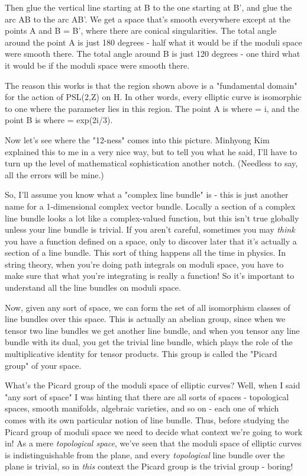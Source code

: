Then glue the vertical line starting at B to the one starting at B',
and glue the arc AB to the arc AB'.  We get a space that's smooth
everywhere except at the points A and B = B', where there are conical
singularities.  The total angle around the point A is just 180 degrees
- half what it would be if the moduli space were smooth there.  The
total angle around B is just 120 degrees - one third what it would be
if the moduli space were smooth there.

The reason this works is that the region shown above is a "fundamental
domain" for the action of PSL(2,Z) on H.  In other words, every
elliptic curve is isomorphic to one where the parameter \tau  lies in
this region.  The point A is where \tau  = i, and the point B is where
\tau  = exp(2\pi i/3).

Now let's see where the "12-ness" comes into this picture.  Minhyong
Kim explained this to me in a very nice way, but to tell you what he
said, I'll have to turn up the level of mathematical sophistication
another notch.  (Needless to say, all the errors will be mine.)

So, I'll assume you know what a "complex line bundle" is - this is
just another name for a 1-dimensional complex vector bundle.  Locally
a section of a complex line bundle looks a lot like a complex-valued
function, but this isn't true globally unless your line bundle is
trivial.  If you aren't careful, sometimes you may \emph{think} you have a
function defined on a space, only to discover later that it's actually
a section of a line bundle.  This sort of thing happens all the time
in physics.  In string theory, when you're doing path integrals on
moduli space, you have to make sure that what you're integrating is
really a function!  So it's important to understand all the line bundles
on moduli space.

Now, given any sort of space, we can form the set of all isomorphism
classes of line bundles over this space.  This is actually an abelian
group, since when we tensor two line bundles we get another line
bundle, and when you tensor any line bundle with its dual, you get the
trivial line bundle, which plays the role of the multiplicative
identity for tensor products.  This group is called the "Picard 
group" of your space.

What's the Picard group of the moduli space of elliptic curves?  Well,
when I said "any sort of space" I was hinting that there are all sorts
of spaces - topological spaces, smooth manifolds, algebraic varieties,
and so on - each one of which comes with its own particular notion of
line bundle.  Thus, before studying the Picard group of moduli space
we need to decide what context we're going to work in!  As a mere
\emph{topological space}, we've seen that the moduli space of elliptic
curves is indistinguishable from the plane, and every \emph{topological}
line bundle over the plane is trivial, so in \emph{this} context the Picard
group is the trivial group - boring!

